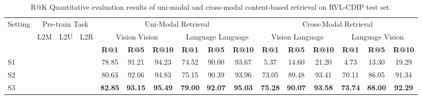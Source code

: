 \documentclass[preprint,review,12pt]{elsarticle}
\newcommand{\cmark}{\ding{51}}\newcommand{\xmark}{\ding{55}}\usepackage{setspace} \doublespacing
\begin{document}
\begin{table*}[t]
\centering
\begin{center}
    \resizebox{\linewidth}{!} {\begin{tabular}{l|ccc|ccc|ccc|ccc|ccc}
        \hline
        Setting & \multicolumn{3}{c}{Pre-train Task} & \multicolumn{6}{c}{Uni-Modal Retrieval} & \multicolumn{6}{c}{Cross-Modal Retrieval} \\
         & L2M & L2U & L2R & \multicolumn{3}{c}{Vision  Vision} & \multicolumn{3}{c}{Language  Language} &  \multicolumn{3}{c}{Vision  Language} &  \multicolumn{3}{c}{Language  Vision}\\
        
        \hline
        
        & & & & \textbf{R@1} & \textbf{R@5} & \textbf{R@10} & \textbf{R@1} & \textbf{R@5} & \textbf{R@10} & \textbf{R@1} & \textbf{R@5} & \textbf{R@10} & \textbf{R@1} & \textbf{R@5} & \textbf{R@10} \\

        \cline{5-16}
        
        S1
        & \cmark & \xmark & \xmark
        & 78.85 & 91.21 & 94.23 & 74.52 & 90.00 & 93.67
        & 5.37 & 14.60 & 21.20 & 4.73 & 13.30 & 19.29 \\
        \hline
        S2
        & \cmark & \cmark & \xmark
        & 80.63 & 92.06 & 94.83 & 75.15 & 90.39 & 93.96 
        & 73.05 & 89.48 & 93.41 & 70.11 & 86.05 & 91.34 \\
        \hline
        S3
        & \cmark & \cmark & \cmark
        & \textbf{82.85} & \textbf{93.15} & \textbf{95.49} & \textbf{79.00} & \textbf{92.07} & \textbf{95.03} 
        & \textbf{75.28} & \textbf{90.07} & \textbf{93.58} & \textbf{73.74} & \textbf{88.00} & \textbf{92.29} \\

        \hline

    \end{tabular}}
\end{center}
\caption{R@K Quantitative evaluation results of uni-modal and cross-modal content-based retrieval on RVL-CDIP test set.}
\label{tab:table_5.4}
\end{table*}   
\end{document}
